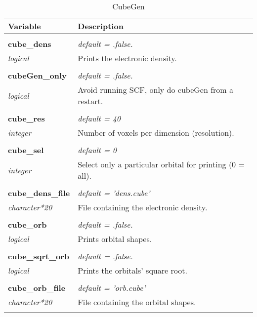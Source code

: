\begin{Spacing}{1.0}
\begin{longtable}{ p{} p{} }

   \toprule
   \textbf{Variable} & Description \\*
   \midrule \\*
   \endhead

   \bottomrule
   \caption{CubeGen}
   \endfoot

   \textbf{cube\_dens}
   &  \textit{default = .false. }
   \\*\textit{logical}
   & Prints the electronic density.\\* \\

   \textbf{cubeGen\_only}
   &  \textit{default = .false. }
   \\*\textit{logical}
   & Avoid running SCF, only do cubeGen from a restart.\\* \\

   \textbf{cube\_res}
   &  \textit{default = 40}
   \\*\textit{integer}
   & Number of voxels per dimension (resolution).\\* \\

   \textbf{cube\_sel}
   &  \textit{default = 0}
   \\*\textit{integer}
   & Select only a particular orbital for printing (0 = all).\\* \\

   \textbf{cube\_dens\_file}
   &  \textit{default = 'dens.cube'}
   \\*\textit{character*20}
   & File containing the electronic density.\\* \\

   \textbf{cube\_orb}
   &  \textit{default = .false. }
   \\*\textit{logical}
   & Prints orbital shapes.\\* \\

   \textbf{cube\_sqrt\_orb}
   &  \textit{default = .false. }
   \\*\textit{logical}
   & Prints the orbitals' square root.\\* \\

   \textbf{cube\_orb\_file}
   &  \textit{default = 'orb.cube'}
   \\*\textit{character*20}
   & File containing the orbital shapes.\\* \\


\end{longtable}
\end{Spacing}
